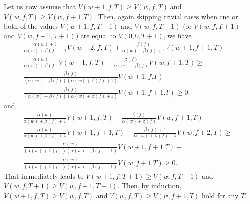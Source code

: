 \documentclass[a4paper,12pt]{article}
\begin{document}
Let us now assume that $V(w+1, f, T) \geq V(w, f, T)$ and $V(w, f, T) \geq V(w, f+1, T)$. Then, again skipping trivial cases when one or both of the values $V(w+1, f, T+1)$ and $V(w, f, T+1)$ (or $V(w, f, T+1)$ and $V(w, f+1, T+1)$) are equal to $V(0, 0, T+1)$, we have 
\begin{equation}
\begin{split}
\frac{\alpha(w) + 1}{\alpha(w) + \beta(f) + 1} V(w + 2, f, T) + \frac{\beta(f)}{\alpha(w) + \beta(f) + 1} V(w+1, f+1, T) - \\ \frac{\alpha(w)}{\alpha(w) + \beta(f)} V(w+1, f, T) - \frac{\beta(f)}{\alpha(w) + \beta(f)} V(w, f+1, T) \geq \\
\frac{\beta(f)}{(\alpha(w) + \beta(f))(\alpha(w) + \beta(f) + 1)} V(w+1, f. T) - \\
\frac{\beta(f)}{(\alpha(w) + \beta(f))(\alpha(w) + \beta(f) + 1)} V(w+1, f+1. T) \geq 0.
\end{split}
\end{equation}
and
\begin{equation}
\begin{split}
\frac{\alpha(w)}{\alpha(w) + \beta(f) + 1} V(w + 1, f, T) + \frac{\beta(f)}{\alpha(w) + \beta(f)} V(w, f+1, T) - \\ \frac{\alpha(w)}{\alpha(w) + \beta(f) + 1} V(w + 1, f + 1, T) - \frac{\beta(f) + 1}{\alpha(w) + \beta(f) + 1} V(w, f+2, T) \geq \\
\frac{\alpha(w)}{(\alpha(w) + \beta(f))(\alpha(w) + \beta(f) + 1)} V(w+1, f+1. T) - \\
\frac{\alpha(w)}{(\alpha(w) + \beta(f))(\alpha(w) + \beta(f) + 1)} V(w, f+1. T) \geq 0.
\end{split}
\end{equation}
That immediately leads to $V(w+1, f, T+1) \geq V(w, f, T+1)$ and $V(w, f, T+1) \geq V(w, f+1, T+1)$. Then, by induction, $V(w+1, f, T) \geq V(w, f, T)$ and $V(w, f, T) \geq V(w, f+1, T)$ hold for any $T$.
\end{document}

